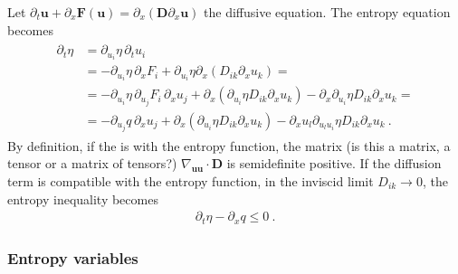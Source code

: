 \documentclass[letterpaper,10pt,english]{jupyterBook}
\begin{document}
\sphinxAtStartPar
Let \(\partial_t \mathbf{u} + \partial_x \mathbf{F}(\mathbf{u}) = \partial_x( \mathbf{D} \partial_x \mathbf{u} )\) the diffusive equation. The entropy equation becomes
\begin{equation*}
\begin{split}\begin{aligned}
  \partial_t \eta
  & = \partial_{u_i} \eta \, \partial_t u_i \\
  & = - \partial_{u_i} \eta \, \partial_{x} F_i + \partial_{u_i} \eta \partial_x \left( D_{ik} \partial_x u_k \right) = \\
  & = - \partial_{u_i} \eta \, \partial_{u_j} F_i \, \partial_x u_j + \partial_x \left( \partial_{u_i} \eta D_{ik} \partial_x u_k \right) - \partial_x \partial_{u_i} \eta D_{ik} \partial_{x} u_k = \\
  & = - \partial_{u_j} q \, \partial_x u_j + \partial_x \left( \partial_{u_i} \eta D_{ik} \partial_x u_k \right) - \partial_x u_l \partial_{u_l u_i} \eta D_{ik} \partial_{x} u_k \ .
\end{aligned}\end{split}
\end{equation*}
\sphinxAtStartPar
By definition, if the  is  with the entropy function, the matrix (is this a matrix, a tensor or a matrix of tensors?) \(\nabla_{\mathbf{u} \mathbf{u}} \cdot \mathbf{D}\) is semi\sphinxhyphen{}definite positive. If the diffusion term is compatible with the entropy function, in the inviscid limit \(D_{ik} \rightarrow 0\), the entropy inequality becomes
\begin{equation*}
\begin{split}\partial_t \eta - \partial_x q \le 0 \ .\end{split}
\end{equation*}\subsubsection*{Entropy variables}
\end{document}
